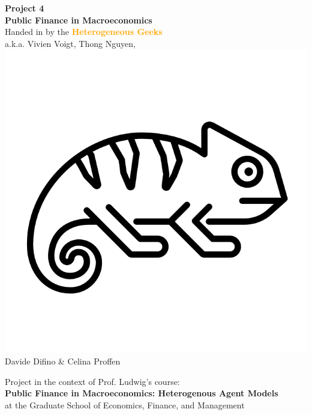 \documentclass[12pt,a4paper]{article}
\begin{document}
\begin{center}
       \vspace*{4cm}
       \huge\textbf{Project 4} \\
       \vspace{0.4cm}
       \large \textbf{Public Finance in Macroeconomics} \\
       \vspace{0.5cm}
        \large Handed in by the \textcolor{orange}{\textbf{Heterogeneous Geeks}} \\
        \vspace{0.3cm}
        a.k.a. Vivien Voigt, Thong Nguyen, \includegraphics[scale=0.06]{stata_output/geek.png}\\Davide Difino \& Celina Proffen \\
       \vspace{1.5cm}
       \vfill



        Project in the context of Prof. Ludwig's course: \\
        \textbf{Public Finance in Macroeconomics: Heterogenous Agent Models}\\
        at the Graduate School of Economics, Finance, and Management
       \vspace{0.8cm}
   \end{center}
\end{document}
